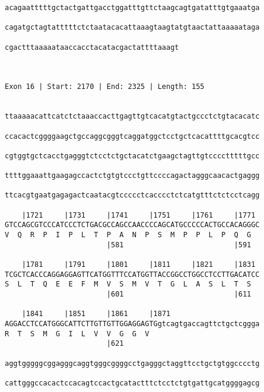 \documentclass{article}
\begin{document}
\begin{Verbatim}
acagaatttttgctactgattgacctggatttgttctaagcagtgatatttgtgaaatga
                                                            
cagatgctagtatttttctctaatacacattaaagtaagtatgtaactattaaaaataga
                                                            
cgactttaaaaataaccacctacatacgactattttaaagt
                                         
                                         
 
Exon 16 | Start: 2170 | End: 2325 | Length: 155


ttaaaaacattcatctctaaaccacttgagttgtcacatgtactgccctctgtacacatc
                                                            
ccacactcggggaagctgccaggcgggtcaggatggctcctgctcacattttgcacgtcc
                                                            
cgtggtgctcacctgagggtctcctctgctacatctgaagctagttgtcccctttttgcc
                                                            
ttttggaaattgaagagccactctgtgtccctgttccccagactagggcaacactgaggg
                                                            
ttcacgtgaatgagagactcaatacgtccccctcacccctctcatgtttctctcctcagg
                                                            
    |1721     |1731     |1741     |1751     |1761     |1771 
GTCCAGCGTCCCATCCCTCTGACGCCAGCCAACCCCAGCATGCCCCCACTGCCACAGGGC
V  Q  R  P  I  P  L  T  P  A  N  P  S  M  P  P  L  P  Q  G  
                        |581                          |591  
  
    |1781     |1791     |1801     |1811     |1821     |1831 
TCGCTCACCCAGGAGGAGTTCATGGTTTCCATGGTTACCGGCCTGGCCTCCTTGACATCC
S  L  T  Q  E  E  F  M  V  S  M  V  T  G  L  A  S  L  T  S  
                        |601                          |611  
  
    |1841     |1851     |1861     |1871                     
AGGACCTCCATGGGCATTCTTGTTGTTGGAGGAGTGgtcagtgaccagttctgctcggga
R  T  S  M  G  I  L  V  V  G  G  V                          
                        |621                                
  
aggtgggggcggagggcaggtgggcggggcctgagggctaggttcctgctgtggcccctg
                                                            
cattgggccacactccacagtccactgcatactttctcctctgtgattgcatggggagcg
                                                            

\end{Verbatim}
\end{document}
